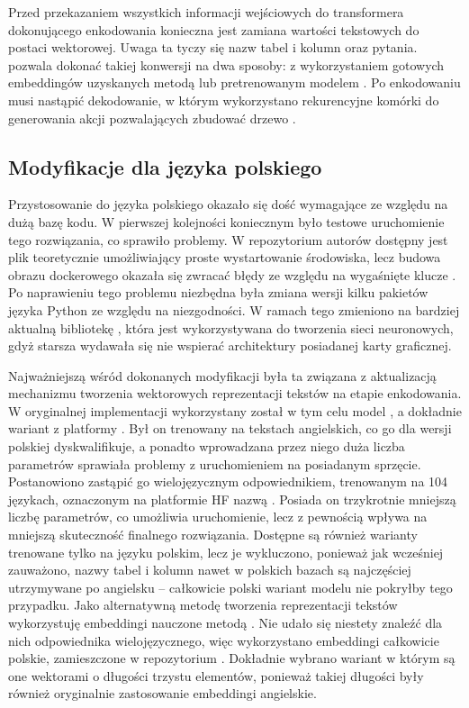 Przed przekazaniem wszystkich informacji wejściowych do transformera dokonującego enkodowania konieczna jest zamiana wartości tekstowych do postaci wektorowej. Uwaga ta tyczy się nazw tabel i kolumn oraz pytania.  pozwala dokonać takiej konwersji na dwa sposoby: z wykorzystaniem gotowych embeddingów uzyskanych metodą  lub pretrenowanym modelem . Po enkodowaniu musi nastąpić dekodowanie, w którym wykorzystano rekurencyjne komórki  do generowania akcji pozwalających zbudować drzewo .

\subsection{Modyfikacje dla języka polskiego}
Przystosowanie  do języka polskiego okazało się dość wymagające ze względu na dużą bazę kodu. W pierwszej kolejności koniecznym było testowe uruchomienie tego rozwiązania, co sprawiło problemy. W repozytorium autorów dostępny jest plik  teoretycznie umożliwiający proste wystartowanie środowiska, lecz budowa obrazu dockerowego okazała się zwracać błędy ze względu na wygaśnięte klucze . Po naprawieniu tego problemu niezbędna była zmiana wersji kilku pakietów języka Python ze względu na niezgodności. W ramach tego zmieniono na bardziej aktualną bibliotekę , która jest wykorzystywana do tworzenia sieci neuronowych, gdyż starsza wydawała się nie wspierać architektury posiadanej karty graficznej.

Najważniejszą wśród dokonanych modyfikacji była ta związana z aktualizacją mechanizmu tworzenia wektorowych reprezentacji tekstów na etapie enkodowania. W oryginalnej implementacji wykorzystany został w tym celu model , a dokładnie wariant  z platformy . Był on trenowany na tekstach angielskich, co go dla wersji polskiej dyskwalifikuje, a ponadto wprowadzana przez niego duża liczba parametrów sprawiała problemy z uruchomieniem na posiadanym sprzęcie. Postanowiono zastąpić go wielojęzycznym odpowiednikiem, trenowanym na 104 językach, oznaczonym na platformie HF nazwą . Posiada on trzykrotnie mniejszą liczbę parametrów, co umożliwia uruchomienie, lecz z pewnością wpływa na mniejszą skuteczność finalnego rozwiązania. Dostępne są również warianty trenowane tylko na języku polskim, lecz je wykluczono, ponieważ jak wcześniej zauważono, nazwy tabel i kolumn nawet w polskich bazach są najczęściej utrzymywane po angielsku -- całkowicie polski wariant modelu  nie pokryłby tego przypadku. Jako alternatywną metodę tworzenia reprezentacji tekstów  wykorzystuję embeddingi nauczone metodą . Nie udało się niestety znaleźć dla nich odpowiednika wielojęzycznego, więc wykorzystano embeddingi całkowicie polskie, zamieszczone w repozytorium . Dokładnie wybrano wariant  w którym są one wektorami o długości trzystu elementów, ponieważ takiej długości były również oryginalnie zastosowanie embeddingi angielskie.

